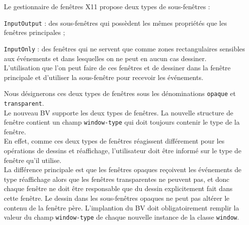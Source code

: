 
Le gestionnaire de fen\^{e}tres X11 propose deux types de sous-fen\^{e}tres :
\begin {Itemize}
\item {\tt InputOutput} : des sous-fen\^{e}tres qui poss\`{e}dent les m\^{e}mes
propri\'{e}t\'{e}s que les fen\^{e}tres principales ;
\item {\tt InputOnly} : des fen\^{e}tres qui ne servent que comme zones
rectangulaires sensibles aux \'{e}v\'{e}nements et dans lesquelles on ne peut
en aucun cas dessiner.\\
L'utilisation que l'on peut faire de ces fen\^{e}tres et de dessiner dans la
fen\^{e}tre  principale et d'utiliser la sous-fen\^{e}tre pour recevoir les
\'{e}v\'{e}nements.
\end {Itemize}
Nous d\'{e}signerons ces deux types de fen\^{e}tres sous les d\'{e}nominations
{\tt opaque} et {\tt transparent}.\\
Le nouveau BV supporte les deux types de fen\^{e}tres. La nouvelle structure de
fen\^{e}tre contient un champ {\tt window-type} qui doit toujours contenir
le type de la fen\^{e}tre.\\
En effet, comme ces deux types de fen\^{e}tres r\'{e}agissent diff\'{e}rement pour les
op\'{e}rations de dessins et r\'{e}affichage, l'utilisateur doit \^{e}tre inform\'{e} sur
le type de fen\^{e}tre qu'il utilise.\\
La diff\'{e}rence principale est que les fen\^{e}tres opaques re\c{c}oivent les
\'{e}v\'{e}nements de type r\'{e}affichage alors que les fen\^{e}tres transparentes ne
peuvent pas, et donc chaque fen\^{e}tre ne doit \^{e}tre responsable que du dessin
explicitement fait dans cette fen\^{e}tre.
Le dessin dans les sous-fen\^{e}tres opaques ne peut pas alt\'{e}rer le contenu de
la fen\^{e}tre p\`{e}re.
L'implantion du BV doit obligatoirement remplir la valeur du champ
{\tt window-type} de chaque nouvelle instance de la classe {\tt window}.



